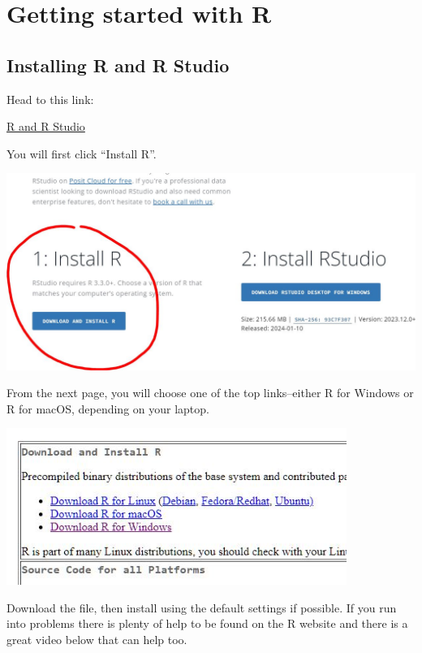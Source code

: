 \documentclass[
]{html}
\theoremstyle{definition}
\theoremstyle{definition}
\theoremstyle{definition}
\theoremstyle{definition}
\theoremstyle{remark}
\begin{document}
\hypertarget{Intro}{%
\section{Getting started with R}\label{Intro}}

\hypertarget{installing-r-and-r-studio}{%
\subsection{Installing R and R Studio}\label{installing-r-and-r-studio}}

Head to this link:

\href{https://posit.co/download/rstudio-desktop/}{R and R Studio}

You will first click ``Install R''.

\href{https://cran.rstudio.com/}{\includegraphics[width=7.27083in,height=\textheight]{images/rstudioinstall.JPG}}

From the next page, you will choose one of the top links--either R for Windows or R for macOS, depending on your laptop.

\href{https://cran.rstudio.com/}{\includegraphics[width=4.36458in,height=\textheight]{images/macpcinstallR.JPG}}

Download the file, then install using the default settings if possible. If you run into problems there is plenty of help to be found on the R website and there is a great video below that can help too.
\end{document}
